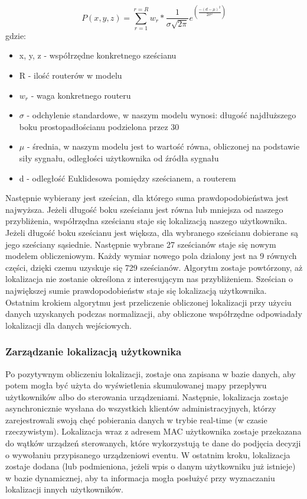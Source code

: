 \begin{equation}
P(x,y,z) = \sum_{r=1}^{r=R} w_r * \frac{1}{\sigma\sqrt{2\pi}}e^{\left(\frac{-(d-\mu)^2}{2\sigma^2}\right)}
\end{equation}
gdzie:
\begin{itemize}
	\item x, y, z - współrzędne konkretnego sześcianu
	\item R - ilość routerów w modelu
	\item $w_r$ - waga konkretnego routeru
	\item $\sigma$ - odchylenie standardowe, w naszym modelu wynosi: długość najdłuższego boku prostopadłościanu podzielona przez 30
	\item $\mu$ - średnia, w naszym modelu jest to wartość równa, obliczonej na podstawie siły sygnału, odległości użytkownika od źródła sygnału
	\item d - odległość Euklidesowa pomiędzy sześcianem, a routerem
\end{itemize}
Następnie wybierany jest sześcian, dla którego suma prawdopodobieństwa jest najwyższa. Jeżeli długość boku sześcianu jest równa lub mniejsza od naszego przybliżenia, współrzędna sześcianu staje się lokalizacją naszego użytkownika. Jeżeli długość boku sześcianu jest większa, dla wybranego sześcianu dobierane są jego sześciany sąsiednie. Następnie wybrane 27 sześcianów staje się nowym modelem obliczeniowym. Każdy wymiar nowego pola dzialony jest na 9 równych części, dzięki czemu uzyskuje się 729 sześcianów. Algorytm zostaje powtórzony, aż lokalizacja nie zostanie określona z interesującym nas przybliżeniem. Sześcian o największej sumie prawdopodobieństw staje się lokalizacją użytkownika.\\
Ostatnim krokiem algorytmu jest przeliczenie obliczonej lokalizacji przy użyciu danych uzyskanych podczas normalizacji, aby obliczone współrzędne odpowiadały lokalizacji dla danych wejściowych.
\subsubsection{Zarządzanie lokalizacją użytkownika}
Po pozytywnym obliczeniu lokalizacji, zostaje ona zapisana w bazie danych, aby potem mogła być użyta do wyświetlenia skumulowanej mapy przepływu użytkowników albo do sterowania urządzeniami. Następnie, lokalizacja zostaje asynchronicznie wysłana do wszystkich klientów administracyjnych, którzy zarejestrowali swoją chęć pobierania danych w trybie real-time (w czasie rzeczywistym). Lokalizacja wraz z adresem MAC użytkownika zostaje przekazana do wątków urządzeń sterowanych, które wykorzystują te dane do podjęcia decyzji o wywołaniu przypisanego urządzeniowi eventu. W ostatnim kroku, lokalizacja zostaje dodana (lub podmieniona, jeżeli wpis o danym użytkowniku już istnieje) w bazie dynamicznej, aby ta informacja mogła posłużyć przy wyznaczaniu lokalizacji innych użytkowników.
